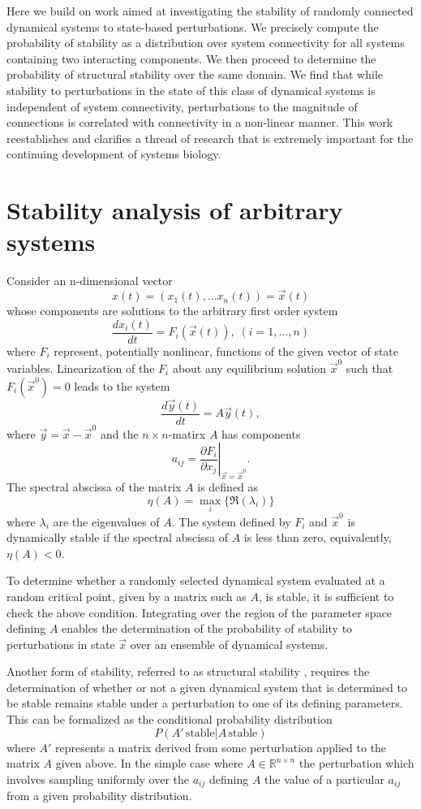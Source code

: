 \documentclass{amsart}
\theoremstyle{definition}
\theoremstyle{remark}
\numberwithin{equation}{section}
\begin{document}
Here we build on work aimed at investigating the stability of randomly connected dynamical systems to state-based perturbations. We precisely compute the probability of stability as a distribution over system connectivity for all systems containing two interacting components. We then proceed to determine the probability of structural stability over the same domain. We find that while stability to perturbations in the state of this class of dynamical systems is independent of system connectivity, perturbations to the magnitude of connections is correlated with connectivity in a non-linear manner. This work reestablishes and clarifies a thread of research that is extremely important for the continuing development of systems biology.

\section{Stability analysis of arbitrary systems}

Consider an n-dimensional vector
$$
x(t) = (x_1(t), \ldots x_n(t)) = \vec{x}(t)
$$
whose components are solutions to the arbitrary first order system
$$
\frac{dx_i(t)}{dt} = F_i(\vec{x}(t)), \; (i=1,\ldots,n)
$$
where $F_i$ represent, potentially nonlinear, functions of the given vector of state variables. Linearization of the $F_i$ about any equilibrium solution $\vec{x}^0$ such that $F_i(\vec{x}^0)=0$ leads to the system
$$
\frac{d\vec{y}(t)}{dt} = A \vec{y}(t),
$$
where $\vec{y} = \vec{x} - \vec{x}^0$ and the $n \times n$-matirx $A$ has components
$$
a_{ij} = \left. \frac{\partial F_i}{\partial x_j} \right|_{\vec{x} = \vec{x}^0}.
$$
The spectral abscissa of the matrix $A$ is defined as
$$
\eta(A) = \max_i \{\Re(\lambda_i)\}
$$
where $\lambda_i$ are the eigenvalues of $A$. The system defined by $F_i$ and $\vec{x}^0$ is dynamically stable if the spectral abscissa of $A$ is less than zero, equivalently, $\eta(A) < 0$.

To determine whether a randomly selected dynamical system evaluated at a random critical point, given by a matrix such as $A$, is stable, it is sufficient to check the above condition. Integrating over the region of the parameter space defining $A$ enables the determination of the probability of stability to perturbations in state $\vec{x}$ over an ensemble of dynamical systems.

Another form of stability, referred to as structural stability \cite{Smale1967}, requires the determination of whether or not a given dynamical system that is determined to be stable remains stable under a perturbation to one of its defining parameters. This can be formalized as the conditional probability distribution
$$
P(A' \, \textrm{stable} | A \, \textrm{stable})
$$
where $A'$ represents a matrix derived from some perturbation applied to the matrix $A$ given above. In the simple case where $A \in \mathbb{R}^{n \times n}$ the perturbation which involves sampling uniformly over the $a_{ij}$ defining $A$ the value of a particular $a_{ij}$ from a given probability distribution.
\end{document}
